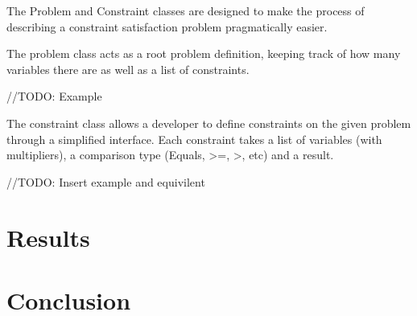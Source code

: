 \documentclass{report}
\begin{document}

The Problem and Constraint classes are designed to make the process of describing a constraint satisfaction problem pragmatically easier.

The problem class acts as a root problem definition, keeping track of how many variables there are as well as a list of constraints.

//TODO: Example

The constraint class allows a developer to define constraints on the given problem through a simplified interface. Each constraint takes a list of variables (with multipliers), a comparison type (Equals, >=, >, etc) and a result.

//TODO: Insert example and equivilent

\chapter {Results}
\chapter {Conclusion}
\end{document}
